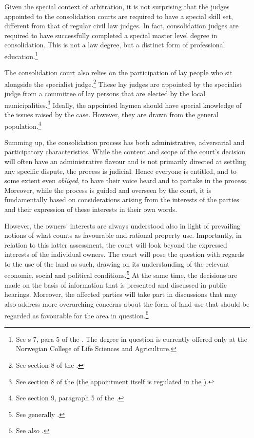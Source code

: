 Given the special context of arbitration, it is not surprising that the judges appointed to the consolidation courts are required to have a special skill set, different from that of regular civil law judges. In fact, consolidation judges are required to have successfully completed a special master level degree in consolidation. This is not a law degree, but a distinct form of professional education.\footnote{See s 7, para 5 of the \cite{lca79}. The degree in question is currently offered only at the Norwegian College of Life Sciences and Agriculture.} 

The consolidation court also relies on the participation of lay people who sit alongside the specialist judge.\footnote{See section 8 of the \cite{lca79}.} These lay judges are appointed by the specialist judge from a committee of lay persons that are elected by the local municipalities.\footnote{See section 8 of the \cite{lca79} (the appointment itself is regulated in the \cite[64]{ca15}).} Ideally, the appointed laymen should have special knowledge of the issues raised by the case. However, they are drawn from the general population.\footnote{See section 9, paragraph 5 of the \cite{lca79}.}

Summing up, the consolidation process has both administrative, adversarial and participatory characteristics. While the content and scope of the court's decision will often have an administrative flavour and is not primarily directed at settling any specific dispute, the process is judicial. Hence everyone is entitled, and to some extent even \emph{obliged}, to have their voice heard and to partake in the process. Moreover, while the process is guided and overseen by the court, it is fundamentally based on considerations arising from the interests of the parties and their  expression of these interests in their own words.

However, the owners' interests are always understood also in light of prevailing notions of what counts as favourable and rational property use. Importantly, in relation to this latter assessment, the court will look beyond the expressed interests of the individual owners. The court will pose the question with regards to the use of the land as such, drawing on its understanding of the relevant economic, social and political conditions.\footnote{See generally \cite{reiten09,sky09}.} At the same time, the decisions are made on the basis of information that is presented and discussed in public hearings. Moreover, the affected parties will take part in discussions that may also address more overarching concerns about the form of land use that should be regarded as favourable for the area in question.\footnote{See also \cite{rognes07}.}

